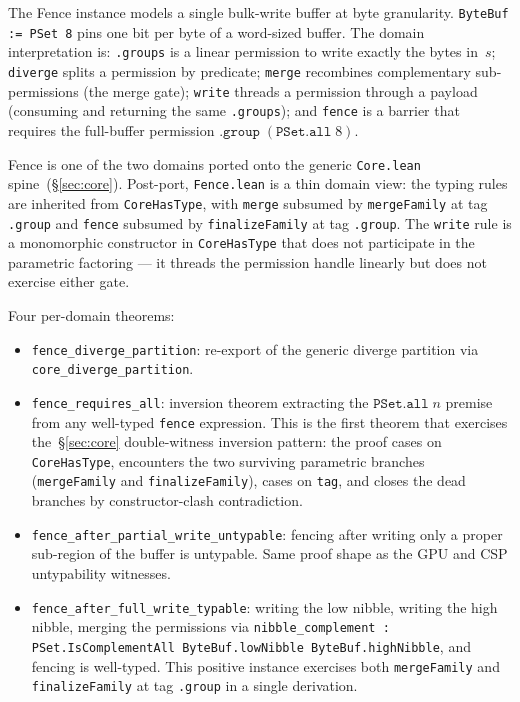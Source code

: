 \documentclass[acmsmall,screen,review,anonymous,nonacm]{acmart}
\newcommand{\CoreHasType}{\texttt{CoreHasType}}
\begin{document}
The Fence instance models a single bulk-write buffer at byte granularity. \texttt{ByteBuf := PSet 8} pins one bit per byte of a word-sized buffer. The domain interpretation is: \texttt{.group\;s} is a linear permission to write exactly the bytes in~$s$; \texttt{diverge} splits a permission by predicate; \texttt{merge} recombines complementary sub-permissions (the merge gate); \texttt{write} threads a permission through a payload (consuming and returning the same \texttt{.group\;s}); and \texttt{fence} is a barrier that requires the full-buffer permission $\texttt{.group}\;(\texttt{PSet.all}\;8)$.

Fence is one of the two domains ported onto the generic \texttt{Core.lean} spine~(\S\ref{sec:core}). Post-port, \texttt{Fence.lean} is a thin domain view: the typing rules are inherited from \CoreHasType{}, with \texttt{merge} subsumed by \texttt{mergeFamily} at tag \texttt{.group} and \texttt{fence} subsumed by \texttt{finalizeFamily} at tag \texttt{.group}. The \texttt{write} rule is a monomorphic constructor in \CoreHasType{} that does not participate in the parametric factoring --- it threads the permission handle linearly but does not exercise either gate.

Four per-domain theorems:

\begin{itemize}
  \item \texttt{fence\_diverge\_partition}: re-export of the generic diverge partition via \texttt{core\_diverge\_partition}.
  \item \texttt{fence\_requires\_all}: inversion theorem extracting the $\texttt{PSet.all}\;n$ premise from any well-typed \texttt{fence} expression. This is the first theorem that exercises the~\S\ref{sec:core} double-witness inversion pattern: the proof cases on \CoreHasType{}, encounters the two surviving parametric branches (\texttt{mergeFamily} and \texttt{finalizeFamily}), cases on \texttt{tag}, and closes the dead branches by constructor-clash contradiction.
  \item \texttt{fence\_after\_partial\_write\_untypable}: fencing after writing only a proper sub-region of the buffer is untypable. Same proof shape as the GPU and CSP untypability witnesses.
  \item \texttt{fence\_after\_full\_write\_typable}: writing the low nibble, writing the high nibble, merging the permissions via \texttt{nibble\_complement : PSet.IsComplementAll ByteBuf.lowNibble ByteBuf.highNibble}, and fencing is well-typed. This positive instance exercises both \texttt{mergeFamily} and \texttt{finalizeFamily} at tag \texttt{.group} in a single derivation.
\end{itemize}
\end{document}
